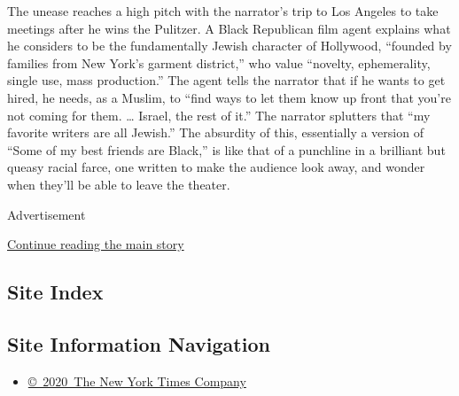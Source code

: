 The unease reaches a high pitch with the narrator's trip to Los Angeles
to take meetings after he wins the Pulitzer. A Black Republican film
agent explains what he considers to be the fundamentally Jewish
character of Hollywood, ``founded by families from New York's garment
district,'' who value ``novelty, ephemerality, single use, mass
production.'' The agent tells the narrator that if he wants to get
hired, he needs, as a Muslim, to ``find ways to let them know up front
that you're not coming for them. \ldots{} Israel, the rest of it.'' The
narrator splutters that ``my favorite writers are all Jewish.'' The
absurdity of this, essentially a version of ``Some of my best friends
are Black,'' is like that of a punchline in a brilliant but queasy
racial farce, one written to make the audience look away, and wonder
when they'll be able to leave the theater.

Advertisement

\protect\hyperlink{after-bottom}{Continue reading the main story}

\hypertarget{site-index}{%
\subsection{Site Index}\label{site-index}}

\hypertarget{site-information-navigation}{%
\subsection{Site Information
Navigation}\label{site-information-navigation}}

\begin{itemize}
\tightlist
\item
  \href{https://help.nytimes3xbfgragh.onion/hc/en-us/articles/115014792127-Copyright-notice}{©~2020~The
  New York Times Company}
\end{itemize}

